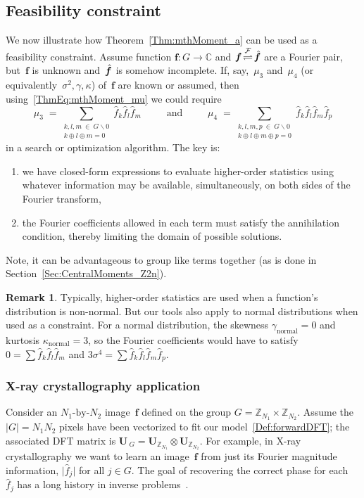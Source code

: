 \documentclass[letterpaper,11pt]{article}
\newcommand{\bs}[1]{{\boldsymbol{#1}}}
\newcommand{\abs}[1]{\vert #1 \vert}
\newcommand{\C}{\mathbb C}
\newcommand{\Int}{\mathbb Z}
\newcommand{\hatbsf}{{\kern+0.25em}\hat{{\kern-0.25em}\bs{f}}}
\theoremstyle{definition} \newtheorem{remark}{Remark}
\begin{document}
\subsection{Feasibility constraint} \label{Sec:FeasibilityConstraint_DFT_example}
We now illustrate how Theorem~\ref{Thm:mthMoment_a} can be used as a feasibility constraint. Assume function $\bs{f}:G\rightarrow\C$ and $\bs{f} \! \stackrel{\mathcal{F}}\rightleftharpoons \! \hatbsf$ are a Fourier pair, but~$\bs{f}$ is unknown and~$\hatbsf$ is somehow incomplete. If, say,~$\mu_3$ and~$\mu_4$ (or equivalently~$\sigma^2,\gamma,\kappa$) of~$\bs{f}$ are known or assumed, then using~\eqref{ThmEq:mthMoment_mu} we could require
$$
\mu_3 \;= \sum_{\substack{k,l,m\:\!\in\:\!G\backslash0\\[2pt] k \oplus l \oplus m = 0}}
    \hat{f}_k \hat{f}_l \hat{f}_m
\;\;\qquad\text{and}\qquad\;\;
\mu_4 \;= \sum_{\substack{k,l,m,p\:\!\in\:\!G\backslash0\\[2pt] k \oplus l \oplus m \oplus p = 0}}
    \hat{f}_k \hat{f}_l \hat{f}_m \hat{f}_p
$$
in a search or optimization algorithm. The key is:
\begin{enumerate}
\item[(i)] we have closed-form expressions to evaluate higher-order statistics using whatever information may be available, simultaneously, on both sides of the Fourier transform,
\item[(ii)] the Fourier coefficients allowed in each term must satisfy the annihilation condition, thereby limiting the domain of possible solutions.
\end{enumerate}
Note, it can be advantageous to group like terms together (as is done in Section~\ref{Sec:CentralMoments_Z2n}).

\begin{remark} \label{Rem:Normal_constraint}
Typically, higher-order statistics are used when a function's distribution is non-normal. But our tools also apply to normal distributions when used as a constraint. For a normal distribution, the skewness $\gamma_\text{normal} = 0$ and kurtosis $\kappa_\text{normal} = 3$, so the Fourier coefficients would have to satisfy $0 = \sum \hat{f}_k \hat{f}_l \hat{f}_m$ and $3\sigma^4 = \sum \hat{f}_k \hat{f}_l \hat{f}_m \hat{f}_p$.
\end{remark}


\subsubsection{X-ray crystallography application}
Consider an $N_1\text{-by-}N_2$ image~$\bs{f}$ defined on the group $G=\Int_{N_1}\!\times\Int_{N_2}$. Assume the $\abs{G}=N_1N_2$ pixels have been  vectorized to fit our model~\eqref{Def:forwardDFT}; the associated DFT matrix is $\bs{U}_{\:\!\!G} = \bs{U}_{\Int_{N_1}} \!\otimes \bs{U}_{\Int_{N_2}}$. For example, in X-ray crystallography we want to learn an image~$\bs{f}$ from just its Fourier magnitude information, $\abs{\hat{f}_j}$ for all $j\in G$. The goal of recovering the correct phase for each~$\hat{f}_j$ has a long history in inverse problems~\cite{wolf2011historyXrayPhaseProblem}.
\end{document}
